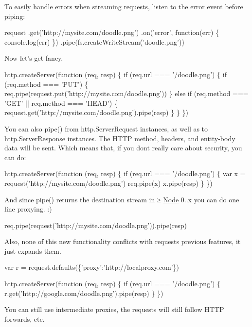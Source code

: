 To easily handle errors when streaming requests, listen to the {\ttfamily error} event before piping\+:


\begin{DoxyCode}
request
  .get('http://mysite.com/doodle.png')
  .on('error', function(err) \{
    console.log(err)
  \})
  .pipe(fs.createWriteStream('doodle.png'))
\end{DoxyCode}


Now let’s get fancy.


\begin{DoxyCode}
http.createServer(function (req, resp) \{
  if (req.url === '/doodle.png') \{
    if (req.method === 'PUT') \{
      req.pipe(request.put('http://mysite.com/doodle.png'))
    \} else if (req.method === 'GET' || req.method === 'HEAD') \{
      request.get('http://mysite.com/doodle.png').pipe(resp)
    \}
  \}
\})
\end{DoxyCode}


You can also {\ttfamily pipe()} from {\ttfamily http.\+Server\+Request} instances, as well as to {\ttfamily http.\+Server\+Response} instances. The H\+T\+TP method, headers, and entity-\/body data will be sent. Which means that, if you don\textquotesingle{}t really care about security, you can do\+:


\begin{DoxyCode}
http.createServer(function (req, resp) \{
  if (req.url === '/doodle.png') \{
    var x = request('http://mysite.com/doodle.png')
    req.pipe(x)
    x.pipe(resp)
  \}
\})
\end{DoxyCode}


And since {\ttfamily pipe()} returns the destination stream in ≥ \mbox{\hyperlink{classNode}{Node}} 0..\+x you can do one line proxying. \+:)


\begin{DoxyCode}
req.pipe(request('http://mysite.com/doodle.png')).pipe(resp)
\end{DoxyCode}


Also, none of this new functionality conflicts with requests previous features, it just expands them.


\begin{DoxyCode}
var r = request.defaults(\{'proxy':'http://localproxy.com'\})

http.createServer(function (req, resp) \{
  if (req.url === '/doodle.png') \{
    r.get('http://google.com/doodle.png').pipe(resp)
  \}
\})
\end{DoxyCode}


You can still use intermediate proxies, the requests will still follow H\+T\+TP forwards, etc.

